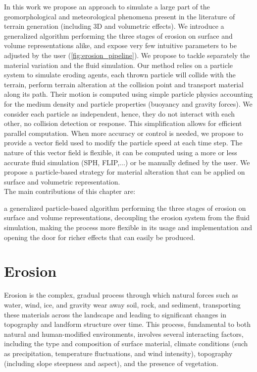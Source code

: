 In this work we propose an approach to simulate a large part of the geomorphological and meteorological phenomena present in the literature of terrain generation (including 3D and volumetric effects). We introduce a generalized algorithm performing the three stages of erosion on surface and volume representations alike, and expose very few intuitive parameters to be adjusted by the user (\cref{fig:erosion_pipeline}).
We propose to tackle separately the material variation and the fluid simulation. Our method relies on a particle system to simulate eroding agents, each thrown particle will collide with the terrain, perform terrain alteration at the collision point and transport material along its path. 
Their motion is computed using simple particle physics accounting for the medium density and particle properties (buoyancy and gravity forces). We consider each particle as independent, hence, they do not interact with each other, no collision detection or response. This simplification allows for efficient parallel computation. 
When more accuracy or control is needed, we propose to provide a vector field used to modify the particle speed at each time step. The nature of this vector field is flexible, it can be computed using a more or less accurate fluid simulation (SPH, FLIP,...) or be manually defined by the user. We propose a particle-based strategy for material alteration that can be applied on surface and volumetric representation. \\
The main contributions of this chapter are: 
\begin{Itemize}
\Item{} a generalized particle-based algorithm performing the three
stages of erosion on surface and volume representations,
\Item{} decoupling the erosion system from the fluid simulation, making the process more flexible in its usage and implementation and opening the door for richer effects that can easily be produced.
\end{Itemize}

\section{Erosion}
Erosion is the complex, gradual process through which natural forces such as water, wind, ice, and gravity wear away soil, rock, and sediment, transporting these materials across the landscape and leading to significant changes in topography and landform structure over time. This process, fundamental to both natural and human-modified environments, involves several interacting factors, including the type and composition of surface material, climate conditions (such as precipitation, temperature fluctuations, and wind intensity), topography (including slope steepness and aspect), and the presence of vegetation.

